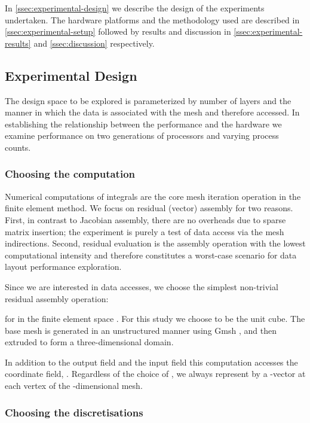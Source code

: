 \documentclass[11pt, a4paper]{scrartcl}
\begin{document}
In \autoref{ssec:experimental-design} we describe the design of the
experiments undertaken. The hardware platforms and the methodology
used are described in \autoref{ssec:experimental-setup} followed by
results and discussion in \autoref{ssec:experimental-results} and
\autoref{ssec:discussion} respectively.

\subsection{Experimental Design}
\label{ssec:experimental-design}

The design space to be explored is parameterized by number of layers
and the manner in which the data is associated with the mesh and
therefore accessed. In establishing the relationship between the
performance and the hardware we examine performance on two generations
of processors and varying process counts.

\subsubsection{Choosing the computation}
\label{sssec:choosing-computation}
Numerical computations of integrals are the core mesh iteration
operation in the finite element method. We focus on residual (vector)
assembly for two reasons. First, in contrast to Jacobian assembly,
there are no overheads due to sparse matrix insertion; the experiment
is purely a test of data access via the mesh indirections. Second,
residual evaluation is the assembly operation with the lowest
computational intensity and therefore constitutes a worst-case
scenario for data layout performance exploration.

Since we are interested in data accesses, we choose the simplest
non-trivial residual assembly operation:

for  in the finite element space .  For this study we choose
 to be the unit cube.  The base mesh is generated
in an unstructured manner using Gmsh \citep{Geuzaine:2009}, and then
extruded to form a three-dimensional domain.

In addition to the output field  and the input field  this
computation accesses the coordinate field, . Regardless of
the choice of , we always represent  by a -vector at
each vertex of the -dimensional mesh.

\subsubsection{Choosing the discretisations}
\label{sssec:choosing-discretisation}
\end{document}

